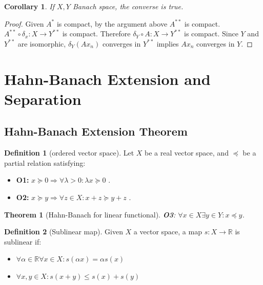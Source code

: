 \documentclass[a4paper,11pt,fleqn]{book}
\newtheorem{theorem}{Theorem}[section]
\newtheorem{corollary}{Corollary}[theorem]
\theoremstyle{definition}
\newtheorem{definition}{Definition}[section]
\theoremstyle{remark}
\begin{document}
\begin{corollary}
	If $X, Y$ Banach space, the converse is true.
\end{corollary}
\begin{proof}
	Given $A^*$ is compact, by the argument above $A^{**}$ is compact. $A^{**} \circ \delta_x: X \rightarrow Y^{**}$ is compact. Therefore $\delta_Y\circ A: X \rightarrow Y^{**} $ is compact. Since $Y$ and $Y^{**}$ are isomorphic, $\delta_Y(Ax_n)$ converges in $Y^{**}$ implies $Ax_n$ converges in $Y$. 
\end{proof}
\newpage




\newpage
\section{Hahn-Banach Extension and Separation}
\subsection{Hahn-Banach Extension Theorem}
\begin{definition}[ordered vector space]
	Let $X$ be a real vector space, and $\preccurlyeq$ be a partial relation satisfying:
	\begin{itemize}
		\item \textbf{O1:} $x \succcurlyeq 0 \Rightarrow \forall \lambda > 0: \lambda x \succcurlyeq 0$ . 
		\item \textbf{O2:} $x \succcurlyeq y \Rightarrow \forall z \in X: x + z \succcurlyeq y + z$ . 
	\end{itemize} 
\end{definition}

\begin{theorem}[Hahn-Banach for linear functional]
	\textbf{O3}: $\forall x \in X \exists y \in Y: x \preccurlyeq y$. 
\end{theorem}

\begin{definition}[Sublinear map]
	Given $X$ a vector space, a map $s: X \rightarrow \mathbb{R}$ is sublinear if:
	\begin{itemize}
		\item $\forall \alpha \in \mathbb{R} \forall x \in X : s(\alpha x) = \alpha s(x)$
		\item $\forall x, y \in X: s(x + y) \leq s(x) + s(y)$ 
	\end{itemize}
\end{definition}
\end{document}
